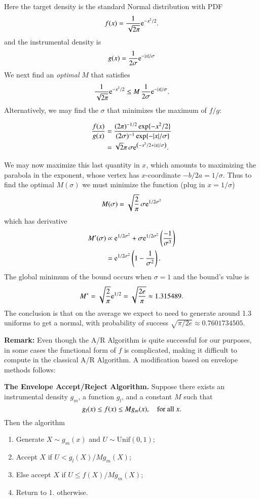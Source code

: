 \documentclass[captions=tableheading]{scrbook}
\begin{document}
Here the target density is the standard Normal distribution with PDF
\[
f(x)=\frac{1}{\sqrt{2\pi}}\mathrm{e}^{-x^{2}/2}.
\]
and the instrumental density is 
\[
g(x)=\frac{1}{2\sigma}\mathrm{e}^{-|x|/\sigma}
\]
We next find an \emph{optimal} $M$ that satisfies 
\[
\frac{1}{\sqrt{2\pi}}\mathrm{e}^{-x^{2}/2}\leq M\,\frac{1}{2\sigma}\mathrm{e}^{-|x|/\sigma}.
\]
Alternatively, we may find the $\sigma$ that minimizes the maximum of $f/g$:

\begin{align*}
\frac{f(x)}{g(x)} & =\frac{(2\pi)^{-1/2}\exp\{-x^{2}/2\}}{(2\sigma)^{-1}\exp\{-|x|/\sigma\}}\\
 & =\sqrt{2}{\pi}\,\sigma \mathrm{e}^{\left(-x^{2}/2+|x|/\sigma\right)}.
\end{align*}

We may now maximize this last quantity in $x$, which amounts to maximizing the parabola in the exponent, whose vertex has $x$-coordinate $-b/2a = 1/\sigma$. Thus to find the optimal $M(\sigma)$ we must minimize the function (plug in $x=1/\sigma$) 
\[
M(\sigma)=\sqrt{\frac{2}{\pi}}\,\sigma \mathrm{e}^{1/2\sigma^{2}}
\]
which has derivative 
\begin{align*}
M'(\sigma) & \propto \mathrm{e}^{1/2\sigma^{2}}+\sigma \mathrm{e}^{1/2\sigma^{2}}\left(\frac{-1}{\sigma^{3}}\right)\\
 & = \mathrm{e}^{1/2\sigma^{2}}\left(1-\frac{1}{\sigma^{2}}\right).
\end{align*}
The global minimum of the bound occurs when $\sigma=1$ and the bound's value is 
\[
M^{\ast}=\sqrt{\frac{2}{\pi}}\mathrm{e}^{1/2}=\sqrt{\frac{2e}{\pi}}\approx 1.315489.
\]
The conclusion is that on the average we expect to need to generate around 1.3 uniforms to get a normal, with probability of success $\sqrt{\pi/2e}\approx0.7601734505$.
 
\textbf{Remark:} Even though the A/R Algorithm is quite successful for our purposes, in some cases the functional form of $f$ is complicated, making it difficult to compute in the classical A/R Algorithm. A modification based on envelope methods follows:

\textbf{The Envelope Accept/Reject Algorithm.} Suppose there exists an instrumental density $g_{m}$, a function $g_{l}$, and a constant $M$ such that 
\[
g_{l}(x)\leq f(x)\leq Mg_{m}(x),\quad\mbox{for all \ensuremath{x}}.
\]
Then the algorithm

\begin{enumerate}
\item Generate $X\sim g_{m}(x)$ and $U\sim\mathrm{Unif}(0,1)$;
\item Accept $X$ if $U < g_{l}(X)/Mg_{m}(X)$;
\item Else accept $X$ if $U \leq f(X)/M g_{m}(X)$;
\item Return to 1. otherwise.
\end{enumerate}
\end{document}
